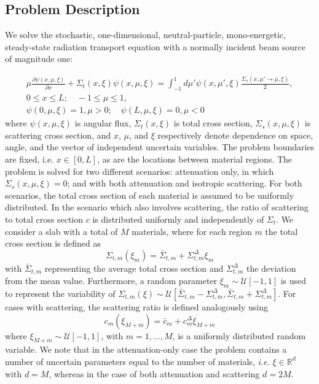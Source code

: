 \subsection{Problem Description}
\label{kbc:sec:problem}
We solve the stochastic, one-dimensional, neutral-particle, mono-energetic, steady-state radiation transport equation with a normally incident beam source of magnitude one:

\begin{gather}
	\label{kbc:eq:transport}
 	\mu \frac{\partial \psi(x,\mu,\xi)}{\partial x} + \Sigma_t(x,\xi) \psi(x,\mu,\xi) =  \int_{-1}^{1} d\mu' \psi(x,\mu',\xi) \frac{\Sigma_s(x,\mu' \rightarrow \mu,\xi)}{2} , \\
	0 \leq x \leq L; \quad -1 \leq \mu \leq 1, \\
	\psi(0,\mu,\xi) = 1, \mu > 0; \quad \psi(L,\mu,\xi) = 0, \mu < 0
\end{gather}
\noindent where $\psi(x, \mu, \xi)$ is angular flux, $\Sigma_t(x, \xi)$ is total cross section, $\Sigma_s(x,\mu, \xi)$ is scattering cross section, and $x$, $\mu$, and $\xi$ respectively denote dependence on space, angle, and the vector of independent uncertain variables. The problem boundaries are fixed, i.e. $x \in [0,L]$, as are the locations between material regions. The problem is solved for two different scenarios: attenuation only, in which $\Sigma_s(x,\mu,\xi) = 0$; and with both attenuation and isotropic scattering. For both scenarios, the total cross section of each material is assumed to be uniformly distributed. In the scenario which also involves scattering, the ratio of scattering to total cross section $c$ is distributed uniformly and independently of $\Sigma_t$. We consider a slab with a total of $M$ materials, where for each region $m$ the total cross section is defined as    
\begin{equation}
	\Sigma_{t,m}(\xi_m) = \bar{\Sigma}_{t,m} + \Sigma_{t,m}^{\Delta}\xi_m
\end{equation}
with $\bar{\Sigma}_{t,m}$ representing the average total cross section and $\Sigma_{t,m}^{\Delta}$ the deviation from the mean value. Furthermore, a random parameter $\xi_m \sim \mathcal{U}[-1,1]$ is used to represent the variability of $\Sigma_{t,m}(\xi) \sim \mathcal{U}[ \bar{\Sigma}_{t,m}-\Sigma_{t,m}^{\Delta}, \bar{\Sigma}_{t,m}+\Sigma_{t,m}^{\Delta} ]$. For cases with scattering, the scattering ratio is defined analogously using 
\begin{equation}
	c_{m}(\xi_{M+m}) = \bar{c}_{m} + c_{m}^{\Delta}\xi_{M+m}
\end{equation} 
where $\xi_{M+m} \sim \mathcal{U}[-1,1]$, with $m=1,\dots,M$, is a uniformly distributed random variable. We note that in the attenuation-only case the problem contains a number of uncertain parameters equal to the number of materials, \textit{i.e.} $\xi \in \mathbb{R}^d$ with $d=M$, whereas in the case of both attenuation and scattering $d=2M$.   

